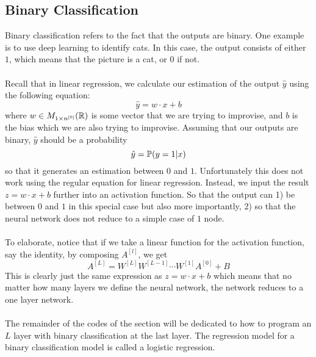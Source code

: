 \documentclass[a4paper]{article}
\begin{document}
\subsection{Binary Classification}
Binary classification refers to the fact that the outputs are binary. One example is to use deep learning to identify cats. In this case, the output consists of either $1$, which means that the picture is a cat, or $0$ if not. \\~\\
Recall that in linear regression, we calculate our estimation of the output $\hat{y}$ using the following equation: $$\hat{y}=w\cdot x+b$$ where $w\in M_{1\times n^{[0]}}(\mathbb{R})$ is some vector that we are trying to improvise, and $b$ is the bias which we are also trying to improvise. Assuming that our outputs are binary, $\hat{y}$ should be a probability $$\hat{y}=\mathbb{P}(y=1|x)$$ so that it generates an estimation between $0$ and $1$. Unfortunately this does not work using the regular equation for linear regression. Instead, we input the result $z=w\cdot x+b$ further into an activation function. So that the output can 1) be between $0$ and $1$ in this special case but also more importantly, 2) so that the neural network does not reduce to a simple case of $1$ node. \\~\\
To elaborate, notice that if we take a linear function for the activation function, say the identity, by composing $A^{[l]}$, we get $$A^{[L]}=W^{[L]}W^{[L-1]}\cdots W^{[1]}A^{[0]}+B$$ This is clearly just the same expression as $z=w\cdot x+b$ which means that no matter how many layers we define the neural network, the network reduces to a one layer network. \\~\\
The remainder of the codes of the section will be dedicated to how to program an $L$ layer with binary classification at the last layer. The regression model for a binary classification model is called a logistic regression. 
\end{document}
